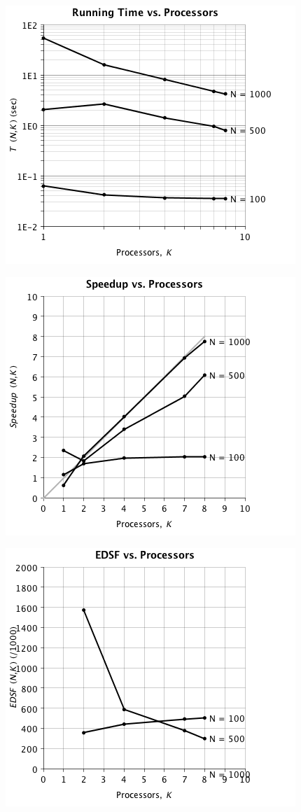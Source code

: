 \documentclass{dependencies/acm_proc_article-sp}
\begin{document}
\begin{center}
\includegraphics[scale=0.5]{images/parallel/run-vs-proc.png}
\end{center}
\begin{center}
\includegraphics[scale=0.5]{images/parallel/speedup-vs-proc.png}
\end{center}
\begin{center}
\includegraphics[scale=0.5]{images/parallel/edsf-vs-proc.png}
\end{center}
\end{document}
